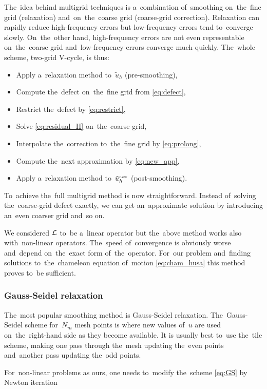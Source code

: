 The~idea behind multigrid techniques is a~combination of~smoothing on~the~fine grid (relaxation) and~on~the~coarse grid (coarse-grid correction). Relaxation can rapidly reduce high-frequency errors but low-frequency errors tend to~converge slowly. On~the~other hand, high-frequency errors are not even representable on~the~coarse grid and~low-frequency errors converge much quickly. The~whole scheme, two-grid V-cycle, is thus:
\begin{itemize}
    \item Apply a~relaxation method to~$\tilde u_h$ (pre-smoothing),
    \item Compute the~defect on~the~fine grid from \eqref{eq:defect},
    \item Restrict the~defect by \eqref{eq:restrict},
    \item Solve \eqref{eq:residual_H} on~the~coarse grid,
    \item Interpolate the~correction to~the~fine grid by \eqref{eq:prolong},
    \item Compute the~next approximation by \eqref{eq:new_app},
    \item Apply a~relaxation method to~$\tilde u_h^\text{\tiny new}$ (post-smoothing).
\end{itemize}
To~achieve the~full multigrid method is now straightforward. Instead of~solving the~coarse-grid defect exactly, we can get an~approximate solution by introducing an~even coarser grid and~so on.

We considered $\mathcal{L}$ to~be a~linear operator but the~above method works also with~non-linear operators. The~speed of~convergence is obviously worse and~depend on~the~exact form of~the~operator. For~our problem and~finding solutions to~the~chameleon equation of~motion \eqref{eq:cham_husa} this method proves to~be sufficient.

\subsubsection{Gauss-Seidel relaxation}
The~most popular smoothing method is Gauss-Seidel relaxation. The~Gauss-Seidel scheme for~$N_m$ mesh points is
where new values of~$u$ are used on~the~right-hand side as they become available. It is usually best to~use the~tile scheme, making one pass through the~mesh updating the~even points and~another pass updating the~odd points.

For~non-linear problems as ours, one needs to~modify the~scheme \eqref{eq:GS} by Newton iteration
